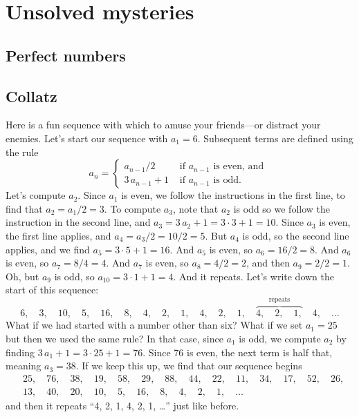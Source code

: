 \documentclass{ximera}
\begin{document}
\section{Unsolved mysteries}

\subsection{Perfect numbers}


\subsection{Collatz}

Here is a fun sequence with which to amuse your friends---or distract
your enemies.  Let's start our sequence with $a_1 = 6$.  Subsequent
terms are defined using the rule
$$
a_n = \begin{cases} a_{n-1} / 2 & \text{ if $a_{n-1}$ is even, and } \\
3 \, a_{n-1} + 1 & \text{ if $a_{n-1}$ is odd.}
\end{cases}
$$
Let's compute $a_2$.  Since $a_1$ is even, we follow the instructions
in the first line, to find that $a_2 = a_1/2 = 3$. To compute $a_3$,
note that $a_2$ is odd so we follow the instruction in the second
line, and $a_3 = 3 \, a_2 + 1 = 3 \cdot 3 + 1 = 10$.  Since $a_3$ is
even, the first line applies, and $a_4 = a_3 / 2 = 10 / 2 = 5$.  But
$a_4$ is odd, so the second line applies, and we find $a_5 = 3 \cdot 5
+ 1 = 16$.  And $a_5$ is even, so $a_6 = 16 / 2 = 8$.  And $a_6$ is
even, so $a_7 = 8/4 = 4$.  And $a_7$ is even, so $a_8 = 4 / 2 = 2$,
and then $a_9 = 2/2 = 1$.  Oh, but $a_9$ is odd, so $a_{10} = 3 \cdot
1 + 1 = 4$.  And it repeats.  Let's write down the start of this sequence:
$$
6,\quad %
3,\quad %
10,\quad  %
5,\quad  %
16,\quad  %
8,\quad  %
4,\quad  %
2,\quad  %
1,\quad  %
4,\quad %
2,\quad %
1,\quad %
\overbrace{4,\quad %
2,\quad %
1,}^{\text{repeats}}\quad %
4,\quad %
\ldots
$$
What if we had started with a number other than six?  What if we set
$a_1 = 25$ but then we used the same rule?  In that case, since $a_1$
is odd, we compute $a_2$ by finding $3 \, a_1 + 1 = 3 \cdot 25 + 1 =
76$.  Since $76$ is even, the next term is half that, meaning $a_3 =
38$.  If we keep this up, we find that our sequence begins
\begin{align*}
&25,\quad 76,\quad 38,\quad 19,\quad 58,\quad 29,\quad 88,\quad 44,\quad 22,\quad 11,\quad 34,\quad 17,\quad 52,\quad 26, \\
&13,\quad 40,\quad 20,\quad 10,\quad 5,\quad 16,\quad 8,\quad 4,\quad 2, \quad 1, \quad \ldots
\end{align*}
and then it repeats ``4, 2, 1, 4, 2, 1, \ldots'' just like before.
\end{document}
